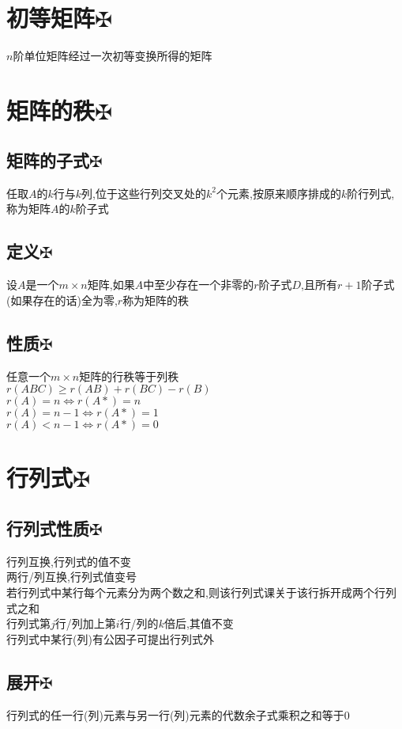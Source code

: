 \documentclass[11pt, a4paper, UTF8]{ctexart}
\begin{document}
\indent\\
\large
\raggedright
\def\fuck{\maltese}
\def\shit#1{#1\protect\hyperlink{catalog}{$\fuck$}}
\def\im{\mbox{Im}}
\hypertarget{catalog}{}
\tableofcontents
\setcounter{secnumdepth}{-1}
\section{\shit{初等矩阵}}
$n$阶单位矩阵经过一次初等变换所得的矩阵
\section{\shit{矩阵的秩}}
\subsection{\shit{矩阵的子式}}
任取$A$的$k$行与$k$列,位于这些行列交叉处的$k^2$个元素,按原来顺序排成的$k$阶行列式,称为矩阵$A$的$k$阶子式
\subsection{\shit{定义}}
设$A$是一个$m\times n$矩阵,如果$A$中至少存在一个非零的$r$阶子式$D$,且所有$r+1$阶子式(如果存在的话)全为零,$r$称为矩阵的秩
\subsection{\shit{性质}}
任意一个$m\times n$矩阵的行秩等于列秩\\
$r(ABC)\ge r(AB)+r(BC)-r(B)$\\
$r(A)=n\Leftrightarrow r(A*)=n$\\
$r(A)=n-1\Leftrightarrow r(A*)=1$\\
$r(A)<n-1\Leftrightarrow r(A*)=0$\\
\section{\shit{行列式}}
\subsection{\shit{行列式性质}}
行列互换,行列式的值不变\\
两行/列互换,行列式值变号\\
若行列式中某行每个元素分为两个数之和,则该行列式课关于该行拆开成两个行列式之和\\
行列式第$j$行/列加上第$i$行/列的$k$倍后,其值不变\\
行列式中某行(列)有公因子可提出行列式外
\subsection{\shit{展开}}
行列式的任一行(列)元素与另一行(列)元素的代数余子式乘积之和等于0
\end{document}

